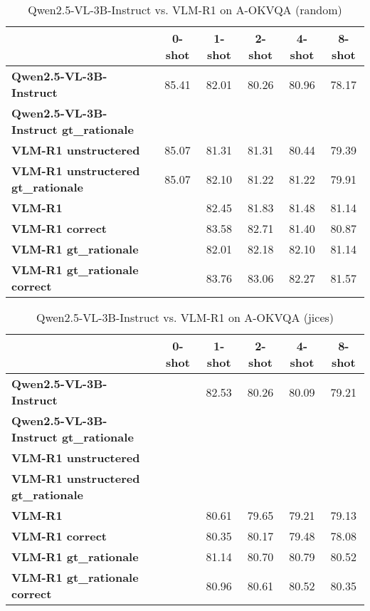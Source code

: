 \begin{table}
\caption{Qwen2.5-VL-3B-Instruct vs. VLM-R1 on A-OKVQA (random)}
\label{tab:Qwen2.5-VL-3B-Instruct_A-OKVQA_TRAIN_random}
\begin{tabular}{lccccc}
\toprule
 & 0-shot & 1-shot & 2-shot & 4-shot & 8-shot \\
\midrule
\textbf{Qwen2.5-VL-3B-Instruct} & 85.41 & 82.01 & 80.26 & 80.96 & 78.17 \\
\textbf{Qwen2.5-VL-3B-Instruct gt\_rationale} &  &  &  &  &  \\
\textbf{VLM-R1 unstructered} & 85.07 & 81.31 & 81.31 & 80.44 & 79.39 \\
\textbf{VLM-R1 unstructered gt\_rationale} & 85.07 & 82.10 & 81.22 & 81.22 & 79.91 \\
\textbf{VLM-R1} &  & 82.45 & 81.83 & 81.48 & 81.14 \\
\textbf{VLM-R1 correct} &  & 83.58 & 82.71 & 81.40 & 80.87 \\
\textbf{VLM-R1 gt\_rationale} &  & 82.01 & 82.18 & 82.10 & 81.14 \\
\textbf{VLM-R1 gt\_rationale correct} &  & 83.76 & 83.06 & 82.27 & 81.57 \\
\bottomrule
\end{tabular}
\end{table}


\begin{table}
\caption{Qwen2.5-VL-3B-Instruct vs. VLM-R1 on A-OKVQA (jices)}
\label{tab:Qwen2.5-VL-3B-Instruct_A-OKVQA_TRAIN_jices}
\begin{tabular}{lccccc}
\toprule
 & 0-shot & 1-shot & 2-shot & 4-shot & 8-shot \\
\midrule
\textbf{Qwen2.5-VL-3B-Instruct} &  & 82.53 & 80.26 & 80.09 & 79.21 \\
\textbf{Qwen2.5-VL-3B-Instruct gt\_rationale} &  &  &  &  &  \\
\textbf{VLM-R1 unstructered} &  &  &  &  &  \\
\textbf{VLM-R1 unstructered gt\_rationale} &  &  &  &  &  \\
\textbf{VLM-R1} &  & 80.61 & 79.65 & 79.21 & 79.13 \\
\textbf{VLM-R1 correct} &  & 80.35 & 80.17 & 79.48 & 78.08 \\
\textbf{VLM-R1 gt\_rationale} &  & 81.14 & 80.70 & 80.79 & 80.52 \\
\textbf{VLM-R1 gt\_rationale correct} &  & 80.96 & 80.61 & 80.52 & 80.35 \\
\bottomrule
\end{tabular}
\end{table}


